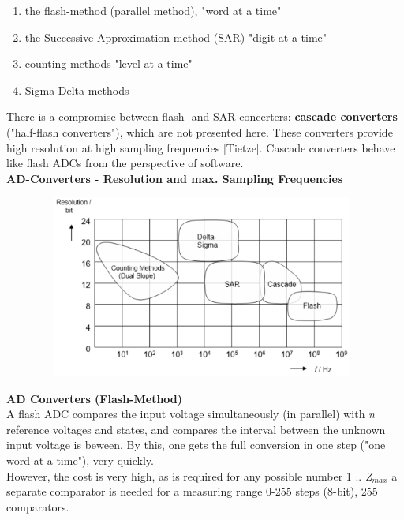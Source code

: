 \begin{enumerate}
\item  the flash-method (parallel method),  "word at a time"
\item  the Successive-Approximation-method (SAR) "digit at a time"
\item  counting methods "level at a time"
\item  Sigma-Delta methods
\end{enumerate}

There is a compromise between flash- and SAR-concerters: \textbf{cascade converters} ("half-flash converters"), which are not presented here. These converters provide high resolution at high sampling frequencies [Tietze]. Cascade converters behave like flash ADCs from the perspective of software.\\

{\rot\bf AD-Converters - Resolution and max. Sampling Frequencies}

    \begin{figure}[h]
    \centering
    \includegraphics[width=11cm, height=6cm]{Images/image174.png}
    \label{fig:Fig }
    \end{figure}

{\rot\bf AD Converters (Flash-Method)}\\

A flash ADC compares the input voltage simultaneously (in parallel) with \textit{n} reference voltages and states, and compares the interval between the unknown input voltage is beween. By this, one gets the full conversion in one step ("one word at a time"), very quickly.\\

However, the cost is very high, as is required for any possible number 1 .. \textit{Z${}_{max}$} a separate comparator is needed  for a measuring range 0-255 steps (8-bit), 255 comparators.\\

